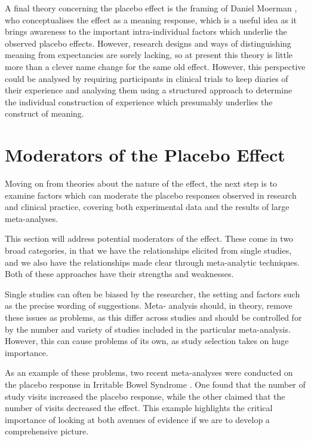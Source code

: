 A final theory concerning the placebo effect is the framing of Daniel Moerman \cite{Moerman2000a,Moerman2003}, who conceptualises the effect as a meaning response, which is a useful idea as it brings awareness to the important intra-individual factors which underlie the observed placebo effects. However, research designs and ways of distinguishing meaning from expectancies are sorely lacking, so at present this theory is little more than a clever name change for the same old effect. However, this perspective could be analysed by requiring participants in clinical trials to keep diaries of their experience and analysing them using a structured approach to determine the individual construction of experience which presumably underlies the construct of meaning. 


\section{Moderators of the Placebo Effect}
\label{sec:moder-plac-effect}
Moving on from theories about the nature of the effect, the next step is to examine factors which can moderate the placebo responses observed in research and clinical practice, covering both experimental data and the results of large meta-analyses. 

This section will address potential moderators of the effect. These come in two broad categories, in that we have the relationships elicited from single studies, and we also have the relationships made clear through meta-analytic techniques. Both of these approaches have their strengths and weaknesses. 

Single studies can often be biased by the researcher, the setting and factors such as the precise wording of suggestions. Meta- analysis should, in theory, remove these issues as problems, as this differ across studies and should be controlled for by the number and variety of studies included in the particular meta-analysis. However, this can cause problems of its own, as study selection takes on huge importance. 

As an example of these problems, two recent meta-analyses were conducted on the placebo response in Irritable Bowel Syndrome \cite{Patel2005,Enck2005}. One found that the number of study visits increased the placebo response, while the other claimed that the number of visits decreased the effect. This example highlights the critical importance of looking at both avenues of evidence if we are to develop a comprehensive picture. 

